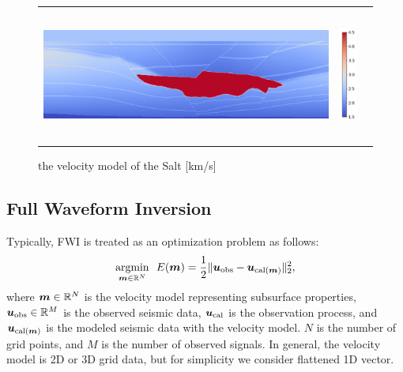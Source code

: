 \begin{figure}[htbp]
    \centering
    \begin{tabular}{m{134mm} m{10mm} m{0mm}}
        \begin{minipage}[b]{136mm}
            \centering
            \includegraphics[width=136mm]{public/full_true_vm}
        \end{minipage} &
        \begin{minipage}[b]{20mm}
            \centering
            \includegraphics[height=44mm]{public/color-bar}
        \end{minipage} &
    \end{tabular}
    \caption{the velocity model of the Salt [km/s]}
    \label{fig:salt-model}
\end{figure}



\subsection{Full Waveform Inversion}\label{subsec:full-waveform-inversion}
Typically, FWI is treated as an optimization problem as follows\cite{FWI0}:
\begin{equation} \label{eq:FWIObjective} \underset{\bm{m} \in \mathbb{R}^N}{\mathrm{argmin}} \ \ E(\bm{m}) = \frac {1} {2} \lVert  \bm{u}_{\mathrm{obs}} - \bm{u}_{\mathrm{cal}(\bm{m})}  \rVert _2^2, \end{equation}
where $\bm{m} \in \mathbb{R}^{N}$ is the velocity model representing subsurface properties, $\bm{u}_{\mathrm{obs}} \in \mathbb{R}^{M}$ is the observed seismic data, $\bm{u}_{\mathrm{cal}}$ is the observation process, and $\bm{u}_{\mathrm{cal}(\bm{m})}$ is the modeled seismic data with the velocity model.
$N$ is the number of grid points, and $M$ is the number of observed signals.
In general, the velocity model is 2D or 3D grid data, but for simplicity we consider flattened 1D vector.

